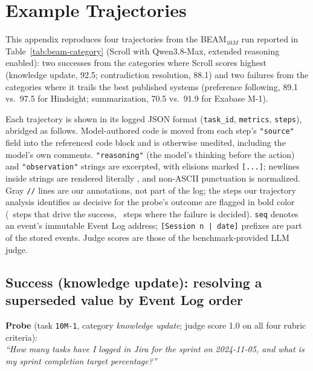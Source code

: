 \section{Example Trajectories}
\label{app:case-studies}

This appendix reproduces four trajectories from the BEAM$_{10M}$ run reported in Table~\ref{tab:beam-category} (Scroll with Qwen3.8-Max, extended reasoning enabled): two successes from the categories where Scroll scores highest (knowledge update, 92.5; contradiction resolution, 88.1) and two failures from the categories where it trails the best published systems (preference following, 89.1 vs.\ 97.5 for Hindsight; summarization, 70.5 vs.\ 91.9 for Exabase M-1).

Each trajectory is shown in its logged JSON format (\texttt{task\_id}, \texttt{metrics}, \texttt{steps}), abridged as follows. 
Model-authored code
is moved from each step's \texttt{"source"} field into the referenced code
block and is otherwise unedited, including the model's own comments.
\texttt{"reasoning"} (the model's thinking before the action) and
\texttt{"observation"} strings are excerpted, with elisions marked
\texttt{[...]}; newlines inside strings are rendered literally
, and non-ASCII
punctuation is normalized. Gray \texttt{//} lines are our annotations, not
part of the log; the steps our trajectory analysis identifies as decisive for
the probe's outcome are flagged in bold color
(\trajgoodline{\texttt{//~>>}}~steps that drive the success,
\trajbadline{\texttt{//~>>}}~steps where the failure is decided).
\texttt{seq} denotes an event's immutable Event Log address;
\texttt{[Session n | date]} prefixes are part of the stored events.
Judge scores are those of the benchmark-provided LLM judge.

\subsection{Success (knowledge update): resolving a superseded value by Event Log order}
\label{app:traj-ku}

\begin{tcolorbox}[colback=codebg, colframe=codeframe, boxrule=0.6pt, left=6pt, right=6pt, top=5pt, bottom=5pt]
\textbf{Probe} (task \texttt{10M-1}, category \emph{knowledge update}; judge score 1.0 on all four rubric criteria):\\[3pt]
\emph{``How many tasks have I logged in Jira for the sprint on 2024-11-05,
and what is my sprint completion target percentage?''}
\end{tcolorbox}

